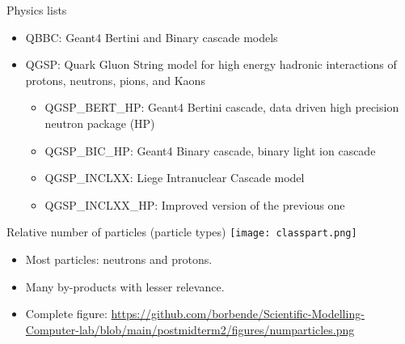 \documentclass[11pt]{beamer}
\begin{document}
\begin{frame}{Physics lists}
    \begin{itemize}
        \item<tri@1-> QBBC: Geant4 Bertini and Binary cascade models
        \vspace{0.2 cm}
        \item<tri@1-> QGSP: Quark Gluon String model for high energy hadronic interactions of protons, neutrons, pions, and Kaons
        \vspace{0.2 cm}
        \begin{itemize}
            \item<square@1-> QGSP\_BERT\_HP: Geant4 Bertini cascade, data driven high precision neutron package (HP)
            \vspace{0.2 cm}
            \item<square@1-> QGSP\_BIC\_HP: Geant4 Binary cascade, binary light ion cascade
            \vspace{0.2 cm}
            \item<square@1-> QGSP\_INCLXX: Liege Intranuclear Cascade model
            \vspace{0.2 cm}
            \item<square@1-> QGSP\_INCLXX\_HP: Improved version of the previous one
        \end{itemize}
    \end{itemize}
\end{frame}

\begin{frame}{Relative number of particles (particle types)}
    \centering
    \texttt{[image: classpart.png]}
    \begin{itemize}
    \vspace{0.2 cm}
        \item<tri@1-> Most particles: neutrons and protons.
        \vspace{0.2 cm}
        \item<tri@1-> Many by-products with lesser relevance.
        \vspace{0.2 cm}
        \item<tri@1-> Complete figure: \url{https://github.com/borbende/Scientific-Modelling-Computer-lab/blob/main/postmidterm2/figures/numparticles.png}
    \end{itemize}
\end{frame}
\end{document}

